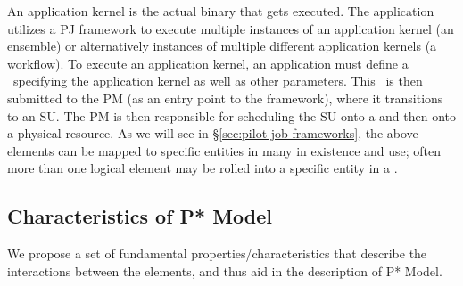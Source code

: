 \documentclass[conference]{IEEEtran}
\begin{document}
An application kernel is the actual binary that gets executed.  The
application utilizes a PJ framework to execute multiple instances of
an application kernel (an ensemble) or alternatively instances of
multiple different application kernels (a workflow).  To execute an
application kernel, an application must define a \cu \ specifying the
application kernel as well as other parameters. This \cu \ is then
submitted to the PM (as an entry point to the
\pilotjob framework), where it transitions to an SU. The PM is then
responsible for scheduling the SU onto a \pilot and then onto a
physical resource.  As we will see in \S\ref{sec:pilot-job-frameworks}, 
the above elements can
be mapped to specific entities in many \pilotjobs in existence and
use; often more than one logical element may be rolled into a specific
entity in a \pilotjob.

% 
% 


\subsection{Characteristics of P* Model}
\label{sec:p_star_elements}



 
We propose a set of fundamental properties/characteristics that
describe the interactions between the elements, and thus aid in the
description of P* Model.
\end{document}
